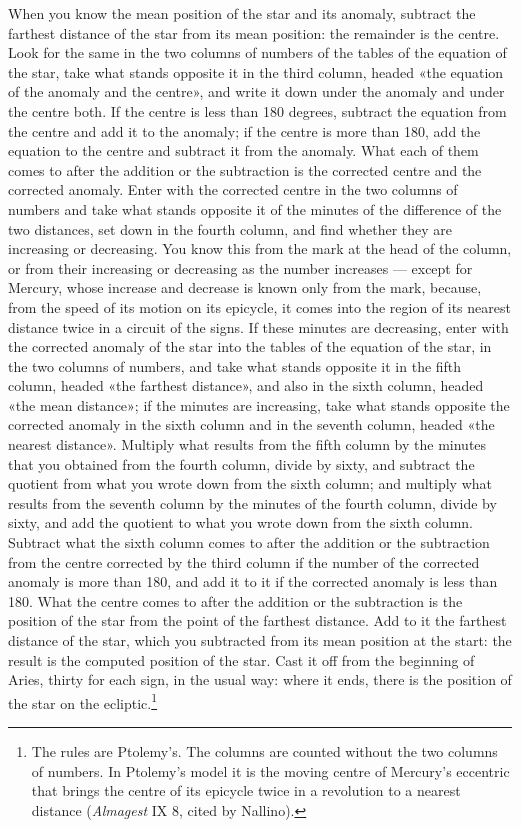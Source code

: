 \documentclass[11pt]{article}
\begin{document}
\par When you know the mean position of the star and its anomaly, subtract the farthest distance of the star from its mean position: the remainder is the centre. Look for the same in the two columns of numbers of the tables of the equation of the star, take what stands opposite it in the third column, headed «the equation of the anomaly and the centre», and write it down under the anomaly and under the centre both. If the centre is less than 180 degrees, subtract the equation from the centre and add it to the anomaly; if the centre is more than 180, add the equation to the centre and subtract it from the anomaly. What each of them comes to after the addition or the subtraction is the corrected centre and the corrected anomaly. Enter with the corrected centre in the two columns of numbers and take what stands opposite it of the minutes of the difference of the two distances, set down in the fourth column, and find whether they are increasing or decreasing. You know this from the mark at the head of the column, or from their increasing or decreasing as the number increases — except for Mercury, whose increase and decrease is known only from the mark, because, from the speed of its motion on its epicycle, it comes into the region of its nearest distance twice in a circuit of the signs. If these minutes are decreasing, enter with the corrected anomaly of the star into the tables of the equation of the star, in the two columns of numbers, and take what stands opposite it in the fifth column, headed «the farthest distance», and also in the sixth column, headed «the mean distance»; if the minutes are increasing, take what stands opposite the corrected anomaly in the sixth column and in the seventh column, headed «the nearest distance». Multiply what results from the fifth column by the minutes that you obtained from the fourth column, divide by sixty, and subtract the quotient from what you wrote down from the sixth column; and multiply what results from the seventh column by the minutes of the fourth column, divide by sixty, and add the quotient to what you wrote down from the sixth column. Subtract what the sixth column comes to after the addition or the subtraction from the centre corrected by the third column if the number of the corrected anomaly is more than 180, and add it to it if the corrected anomaly is less than 180. What the centre comes to after the addition or the subtraction is the position of the star from the point of the farthest distance. Add to it the farthest distance of the star, which you subtracted from its mean position at the start: the result is the computed position of the star. Cast it off from the beginning of Aries, thirty for each sign, in the usual way: where it ends, there is the position of the star on the ecliptic.\footnote{The rules are Ptolemy's. The columns are counted without the two columns of numbers. In Ptolemy's model it is the moving centre of Mercury's eccentric that brings the centre of its epicycle twice in a revolution to a nearest distance (\emph{Almagest} IX 8, cited by Nallino).}\par
\end{document}
